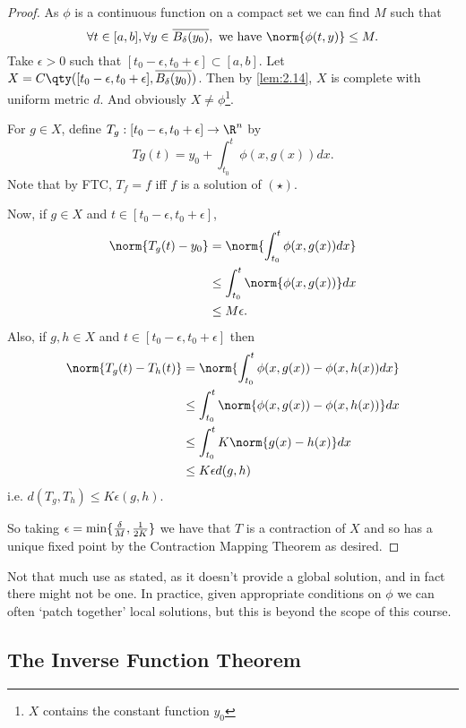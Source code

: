 \begin{proof}
    As $\phi$ is a continuous function on a compact set we can find $M$ such that \[\forall t\in [a,b], \forall y\in  \overline{B_\delta(y_0)}, \textup{ we have }\norm{\phi(t,y)}\leq M. \]
    Take $\epsilon > 0$ such that $[t_0-\epsilon, t_0+\epsilon]\subset [a,b]$. 
    Let $X = C \qty( [t_0-\epsilon, t_0+\epsilon], \overline{B_\delta(y_0)} )$. 
    Then by \cref{lem:2.14}, $X$ is complete with uniform metric $d$. 
    And obviously $X\neq \phi$\footnote{$X$ contains the constant function $y_0$}.

    For $g\in X$, define $T_g:[t_0-\epsilon, t_0+\epsilon] \to \R^n$ by \[Tg(t) = y_0 + \int_{t_0}^t \phi(x,g(x)) dx. \] 
    Note that by FTC, $T_f=f$ iff $f$ is a solution of $(\star)$. 

    Now, if $g\in X$ and $t\in [t_0-\epsilon, t_0+\epsilon]$, 
    \begin{align*}
        \norm{T_g(t) - y_0} &= \norm{\int_{t_0}^t \phi(x,g(x)) dx}\\
        &\leq \int_{t_0}^t \norm{\phi(x,g(x))} dx\\
        &\leq M\epsilon.
    \end{align*}
    Also, if $g,h\in X$ and $t\in [t_0-\epsilon, t_0+\epsilon] $ then 
    \begin{align*}
        \norm{T_g(t) - T_h(t)} &= \norm{\int_{t_0}^t \phi(x,g(x)) - \phi(x,h(x)) dx}\\
        &\leq \int_{t_0}^t \norm{\phi(x,g(x)) - \phi(x,h(x))} dx\\
        &\leq \int_{t_0}^t K\norm{g(x) - h(x)} dx\\
        &\leq K\epsilon d(g,h)
    \end{align*}
    i.e. $d(T_g,T_h) \leq K \epsilon (g,h)$. 
    
    So taking $\epsilon = \min\{\frac{\delta}{M}, \frac{1}{2K}\}$ we have that $T$ is a contraction of $X$ and so has a unique fixed point by the Contraction Mapping Theorem as desired.
\end{proof}

\begin{remark}
    Not that much use as stated, as it doesn't provide a global solution, and in fact there might not be one. 
    In practice, given appropriate conditions on $\phi$ we can often `patch together' local solutions, but this is beyond the scope of this course.
\end{remark}

\subsection{The Inverse Function Theorem}

